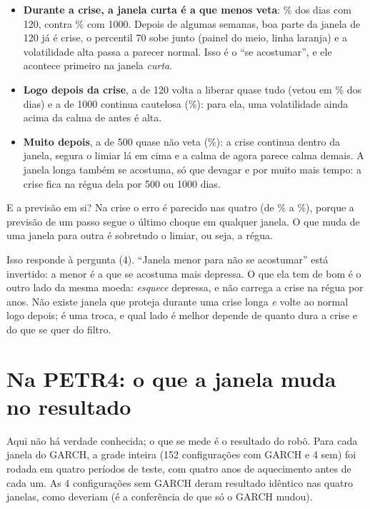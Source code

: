 \documentclass[11pt,a4paper]{article}
\begin{document}
\begin{itemize}\setlength\itemsep{2pt}
\item \textbf{Durante a crise, a janela curta é a que menos veta}: \% dos dias com
120, contra \% com 1000. Depois de algumas semanas, boa parte da janela de 120 já
é crise, o percentil 70 sobe junto (painel do meio, linha laranja) e a volatilidade alta passa a parecer normal.
Isso é o ``se acostumar'', e ele acontece primeiro na janela \emph{curta}.
\item \textbf{Logo depois da crise}, a de 120 volta a liberar quase tudo (vetou em \%
dos dias) e a de 1000 continua cautelosa (\%): para ela, uma volatilidade
ainda acima da calma de antes é alta.
\item \textbf{Muito depois}, a de 500 quase não veta (\%): a crise continua dentro
da janela, segura o limiar lá em cima e a calma de agora parece calma demais. A janela longa também se acostuma,
só que devagar e por muito mais tempo: a crise fica na régua dela por 500 ou 1000 dias.
\end{itemize}

E a previsão em si? Na crise o erro é parecido nas quatro (de \% a
\%), porque a previsão de um passo segue o último choque em qualquer janela. O que
muda de uma janela para outra é sobretudo o limiar, ou seja, a régua.

Isso responde à pergunta (4). ``Janela menor para não se acostumar'' está invertido: a menor é a que se acostuma
mais depressa. O que ela tem de bom é o outro lado da mesma moeda: \emph{esquece} depressa, e não carrega a crise na
régua por anos. Não existe janela que proteja durante uma crise longa \emph{e} volte ao normal logo depois; é uma
troca, e qual lado é melhor depende de quanto dura a crise e do que se quer do filtro.

\section{Na PETR4: o que a janela muda no resultado}\label{sec:petr4}

Aqui não há verdade conhecida; o que se mede é o resultado do robô. Para cada janela do GARCH, a grade inteira (152
configurações com GARCH e 4 sem) foi rodada em quatro períodos de teste, com quatro anos de aquecimento antes de
cada um. As 4 configurações sem GARCH deram resultado idêntico nas quatro janelas, como deveriam (é a conferência
de que só o GARCH mudou).
\end{document}
